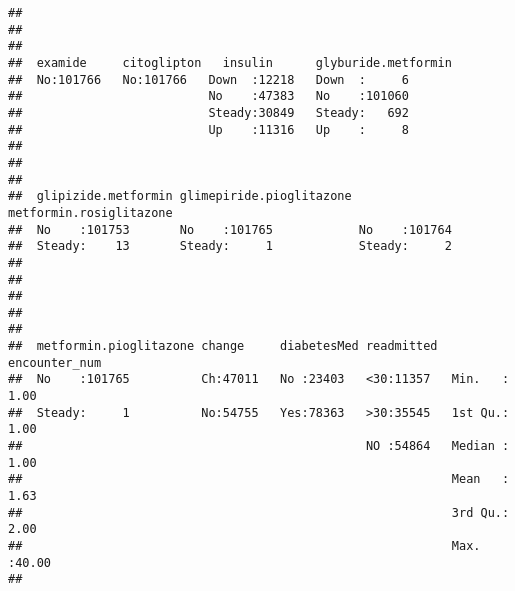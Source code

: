 \documentclass[
]{article}
\begin{document}
\begin{verbatim}
##                                                                 
##                                                                 
##                                                                 
##  examide     citoglipton   insulin      glyburide.metformin
##  No:101766   No:101766   Down  :12218   Down  :     6      
##                          No    :47383   No    :101060      
##                          Steady:30849   Steady:   692      
##                          Up    :11316   Up    :     8      
##                                                            
##                                                            
##                                                            
##  glipizide.metformin glimepiride.pioglitazone metformin.rosiglitazone
##  No    :101753       No    :101765            No    :101764          
##  Steady:    13       Steady:     1            Steady:     2          
##                                                                      
##                                                                      
##                                                                      
##                                                                      
##                                                                      
##  metformin.pioglitazone change     diabetesMed readmitted  encounter_num  
##  No    :101765          Ch:47011   No :23403   <30:11357   Min.   : 1.00  
##  Steady:     1          No:54755   Yes:78363   >30:35545   1st Qu.: 1.00  
##                                                NO :54864   Median : 1.00  
##                                                            Mean   : 1.63  
##                                                            3rd Qu.: 2.00  
##                                                            Max.   :40.00  
## 
\end{verbatim}
\end{document}
